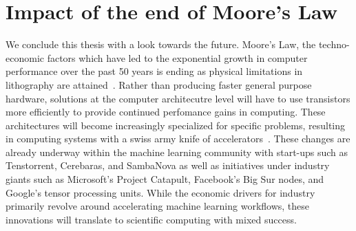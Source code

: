 \section{Impact of the end of Moore's Law}

We conclude this thesis with a look towards the future. Moore's Law, the techno-economic factors which have led to the exponential growth in computer performance over the past 50 years is ending as physical limitations in lithography are attained~\cite{Shalf2020}. Rather than producing faster general purpose hardware, solutions at the computer architecutre level will have to use transistors more efficiently to provide continued perfomance gains in computing. These architectures will become increasingly specialized for specific problems, resulting in computing systems with a swiss army knife of accelerators~\cite{ExtremeHeterogeneity2018}. These changes are already underway within the machine learning community with start-ups such as Tenstorrent, Cerebaras, and SambaNova as well as initiatives under industry giants such as Microsoft's Project Catapult, Facebook's Big Sur nodes, and Google's tensor processing units. While the economic drivers for industry primarily revolve around accelerating machine learning workflows, these innovations will translate to scientific computing with mixed success.

